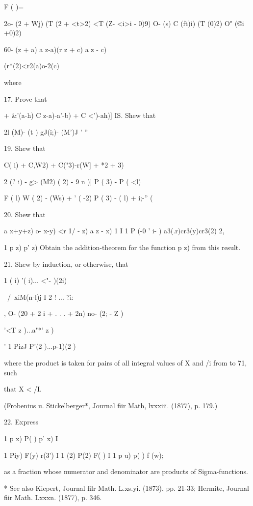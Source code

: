 {F ( )=

2o- (2 + Wj) (T (2 + <t>2) <T (Z- <i>i - 0)9) O- (s) C (ft)i) (T (0)2)
O" (©i +0)2)

60- (z + a) a z-a)(r z + c) a z - c)

(r*(2)<r2(a)o-2(c)

where

17. Prove that

+ \&'(a-h) C z-a)-a'-b) + C <')-ah)] IS. Shew that



2l (M)- (t ) gJ(i;)- (M')J ' ''


19. Shew that

C( i) + C,W2) + C("3)-r(W] + *2 + 3)

2 (? i) - g> (M2) ( 2) - 9 n )] P ( 3) - P ( <l)

F ( l) W ( 2) - (Ws) + ' ( -2) P ( 3) - ( l) + i;-'' (%


20. Shew that

a x+y+z) o- x-y) <r 1/ - z) a z - x) 1 I 1 P (-0 ' i- )
a3(.r)cr3(y)cr3(2) 2,

1 p z) p' z) Obtain the addition-theorem for the function p z) from
this result.

21. Shew by induction, or otherwise, that

1 ( i) '( i)... <"- )(2i)

\ /\ xiM(n-l)j I 2 ! ... ?i:

, O- (20 + 2 i + . . . + 2n) no- (2; - Z )

'<T z )...a"*' z )

' 1 PizJ P'(2 )...p-1)(2 )

where the product is taken for pairs of all integral values of X and
/i from to 71, such

that X < /I.

(Frobenius u. Stickelberger*, Journal fiir Math, lxxxiii. (1877), p.
179.)

22. Express

1 p x) P( ) p' x) I

1 Piy) F(y) r(3') I 1 (2) P(2) F( ) I 1 p u) p( ) f (w);

as a fraction whose numerator and denominator are products of
Sigma-functions.

* See also Kiepert, Journal filr Math. L.xs.yi. (1873), pp. 21-33;
Hermite, Journal fiir Math. Lxxxn. (1877), p. 346.

}
